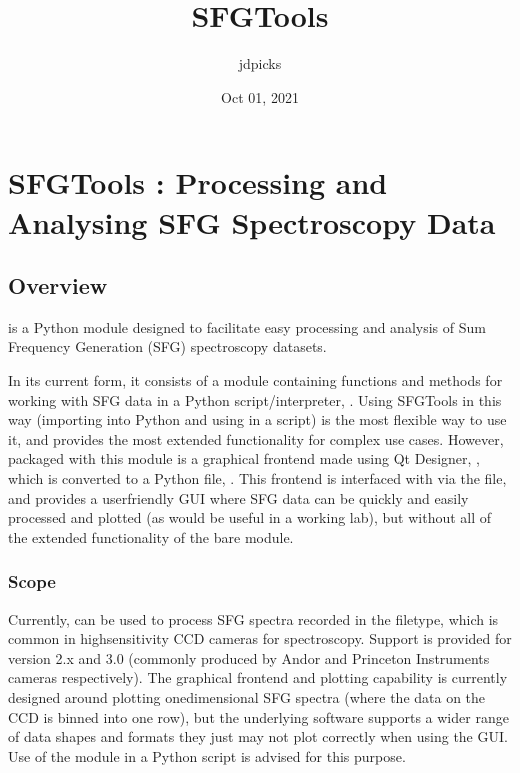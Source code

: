 \documentclass[a4paper,10pt,english]{sphinxmanual}
\title{SFGTools}
\date{Oct 01, 2021}
\author{jdpicks}
\begin{document}
\sphinxmaketitle
\sphinxtableofcontents

\chapter{SFGTools : Processing and Analysing SFG Spectroscopy Data}
\label{\detokenize{index:sfgtools-processing-and-analysing-sfg-spectroscopy-data}}

\section{Overview}
\label{\detokenize{index:overview}}
\sphinxAtStartPar
{} is a Python module designed to facilitate easy processing and analysis of Sum Frequency Generation (SFG) spectroscopy datasets.

\sphinxAtStartPar
In its current form, it consists of a module containing functions and methods for working with SFG data in a Python script/interpreter, . Using SFGTools in this way (importing into Python and using in a script) is the most flexible way to use it, and provides the most extended functionality for complex use cases. However, packaged with this module is a graphical frontend made using Qt Designer, , which is converted to a Python file, . This frontend is interfaced with  via the  file, and provides a user\sphinxhyphen{}friendly GUI where SFG data can be quickly and easily processed and plotted (as would be useful in a working lab), but without all of the extended functionality of the bare module.


\subsection{Scope}
\label{\detokenize{index:scope}}
\sphinxAtStartPar
Currently,  can be used to process SFG spectra recorded in the  filetype, which is common in high\sphinxhyphen{}sensitivity CCD cameras for spectroscopy. Support is provided for  version 2.x and 3.0 (commonly produced by Andor and Princeton Instruments cameras respectively). The graphical frontend and plotting capability is currently designed around plotting one\sphinxhyphen{}dimensional SFG spectra (where the data on the CCD is binned into one row), but the underlying software supports a wider range of data shapes and formats \sphinxhyphen{} they just may not plot correctly when using the GUI. Use of the module in a Python script is advised for this purpose.
\end{document}
